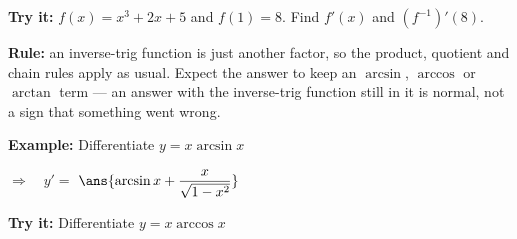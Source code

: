 \documentclass[12pt]{article}
\begin{document}
\begin{tryitbox}
\textbf{Try it:} \quad $f(x) = x^3 + 2x + 5$ and $f(1) = 8$. Find $f'(x)$ and
$\left(f^{-1}\right)'(8)$.\\[2pt]
\end{tryitbox}


\begin{formulabox}
\textbf{Rule:} an inverse-trig function is just another factor, so the product,
quotient and chain rules apply as usual. Expect the answer to keep an
$\arcsin$, $\arccos$ or $\arctan$ term --- an answer with the inverse-trig
function still in it is normal, not a sign that something went wrong.
\end{formulabox}

\begin{examplebox}
\textbf{Example:} \quad Differentiate $y = x\arcsin x$

$\Rightarrow\quad y' = $ $\ans{\arcsin x + \dfrac{x}{\sqrt{1-x^2}}}$
\end{examplebox}

\begin{tryitbox}
\textbf{Try it:} \quad Differentiate $y = x\arccos x$\\[2pt]
\end{tryitbox}
\end{document}
